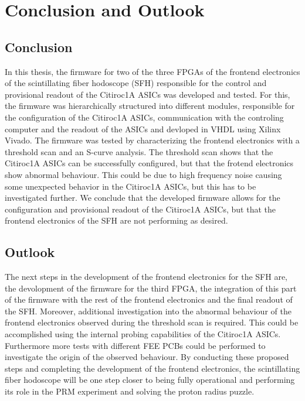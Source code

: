 \chapter{Conclusion and Outlook}
\section{Conclusion}
In this thesis, the firmware for two of the three FPGAs of the frontend electronics of the scintillating fiber hodoscope (SFH) responsible for the control and provisional readout of the Citiroc1A ASICs was developed and tested.
For this, the firmware was hierarchically structured into different modules, responsible for the configuration of the Citiroc1A ASICs, communication with the controling computer and the readout of the ASICs and devloped in VHDL using Xilinx Vivado.
The firmware was tested by characterizing the frontend electronics with a threshold scan and an S-curve analysis.
The threshold scan shows that the Citiroc1A ASICs can be successfully configured, but that the frotend electronics show abnormal behaviour.
This could be due to high frequency noise causing some unexpected behavior in the Citiroc1A ASICs, but this has to be investigated further.
We conclude that the developed firmware allows for the configuration and provisional readout of the Citiroc1A ASICs, 
but that the frontend electronics of the SFH are not performing as desired.

\section{Outlook}
The next steps in the development of the frontend electronics for the SFH are, the devolopment of the firmware for the third FPGA,
the integration of this part of the firmware with the rest of the frontend electronics and the final readout of the SFH.
Moreover, additional investigation into the abnormal behaviour of the frontend electronics observed during the threshold scan is required.
\newline
This could be accomplished using the internal probing capabilities of the Citiroc1A ASICs.
Furthermore more tests with different FEE PCBs could be performed to investigate the origin of the observed behaviour.
\newline
By conducting these proposed steps and completing the development of the frontend electronics,
the scintillating fiber hodoscope will be one step closer to being fully operational and performing its role in the PRM experiment and solving the proton radius puzzle.

